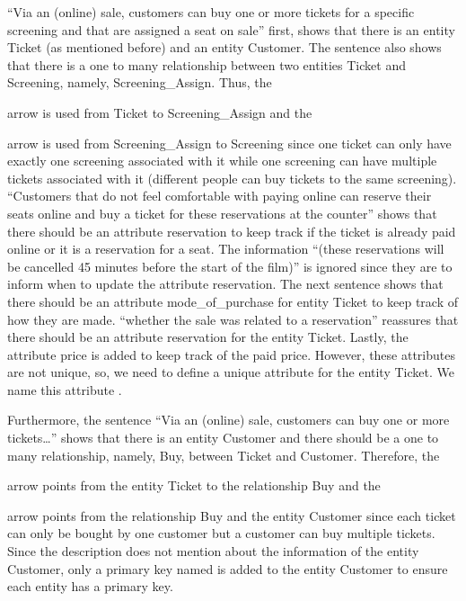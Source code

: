 \documentclass{article}
\newcommand{\key}[1]{\underline{\smash{#1}}}
\begin{document}
``Via an (online) sale, customers can buy one or more tickets for a specific
screening and that are assigned a seat on sale'' first, shows that there is an
entity Ticket (as mentioned before) and an entity Customer. The sentence also
shows that there is a one to many relationship between two entities Ticket and
Screening, namely, Screening\_Assign. Thus, the
arrow is used from Ticket to Screening\_Assign and the
arrow is used from Screening\_Assign to Screening since one ticket can only have
exactly one screening associated with it while one screening can have multiple
tickets associated with it (different people can buy tickets to the same screening).
``Customers that do not feel comfortable with paying online can reserve their
seats online and buy a ticket for these reservations at the counter'' shows that
there should be an attribute reservation to keep track if the ticket is already
paid online or it is a reservation for a seat. The information ``(these reservations
will be cancelled 45 minutes before the start of the film)'' is ignored since
they are to inform when to update the attribute reservation. The next sentence
shows that there should be an attribute mode\_of\_purchase for entity Ticket to
keep track of how they are made. ``whether the sale was related to a reservation''
reassures that there should be an  attribute reservation for the entity Ticket.
Lastly, the attribute price is added to keep track of the paid price. However,
these attributes are not unique, so, we need to define a unique attribute for the
entity Ticket. We name this attribute \key{ticket\_id}.

Furthermore, the sentence ``Via an (online) sale, customers can buy one or more
tickets\dots'' shows that there is an entity Customer and there should be a one
to many relationship, namely, Buy, between Ticket and Customer. Therefore, the
arrow points from the entity Ticket to the relationship Buy and the
arrow points from the relationship Buy and the entity Customer since each ticket
can only be bought by one customer but a customer can buy multiple tickets. Since
the description does not mention about the information of the entity Customer,
only a primary key named \key{customer\_id} is added to the entity Customer to
ensure each entity has a primary key.
\end{document}
